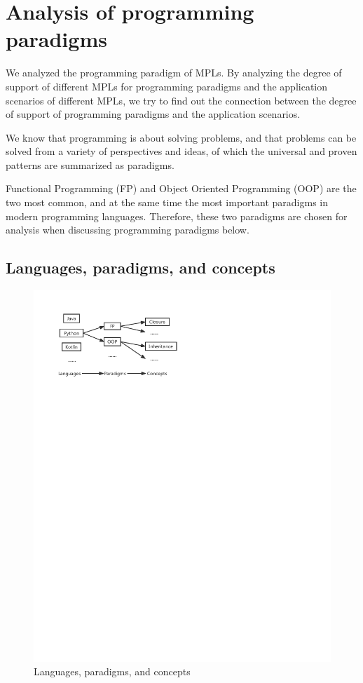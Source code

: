 \section{Analysis of programming paradigms}

We analyzed the programming paradigm of MPLs.
By analyzing the degree of support of different MPLs
for programming paradigms and the application scenarios of
different MPLs, we try to find out the connection between
the degree of support of programming paradigms and the
application scenarios.


We know that programming is about solving problems,
and that problems can be solved from a variety of perspectives
and ideas, of which the universal and proven patterns are
summarized as paradigms.

Functional Programming (FP) and Object Oriented Programming (OOP)
are the two most common, and at the same time the most important paradigms
in modern programming languages.
Therefore, these two paradigms are chosen for analysis when discussing
programming paradigms below.

\subsection{Languages, paradigms, and concepts}

\begin{figure}[htbp]
    \centerline{\includegraphics[scale=0.8]{figures/concept}}
    \caption{Languages, paradigms, and concepts}
    \label{fig:concept}
\end{figure}


